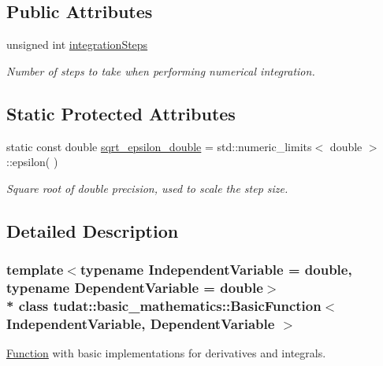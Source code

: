 \subsection*{Public Attributes}
\begin{DoxyCompactItemize}
\item 
unsigned int \hyperlink{classtudat_1_1basic__mathematics_1_1BasicFunction_ae29d47c0ba66688c59c793805c920386}{integration\+Steps}\hypertarget{classtudat_1_1basic__mathematics_1_1BasicFunction_ae29d47c0ba66688c59c793805c920386}{}\label{classtudat_1_1basic__mathematics_1_1BasicFunction_ae29d47c0ba66688c59c793805c920386}

\begin{DoxyCompactList}\small\item\em Number of steps to take when performing numerical integration. \end{DoxyCompactList}\end{DoxyCompactItemize}
\subsection*{Static Protected Attributes}
\begin{DoxyCompactItemize}
\item 
static const double \hyperlink{classtudat_1_1basic__mathematics_1_1BasicFunction_a9d9d85a5dd2bb72ec73619c126593f0d}{sqrt\+\_\+epsilon\+\_\+double} = std\+::numeric\+\_\+limits$<$ double $>$\+::epsilon( )
\begin{DoxyCompactList}\small\item\em Square root of double precision, used to scale the step size. \end{DoxyCompactList}\end{DoxyCompactItemize}


\subsection{Detailed Description}
\subsubsection*{template$<$typename Independent\+Variable = double, typename Dependent\+Variable = double$>$\\*
class tudat\+::basic\+\_\+mathematics\+::\+Basic\+Function$<$ Independent\+Variable, Dependent\+Variable $>$}

\hyperlink{classtudat_1_1basic__mathematics_1_1Function}{Function} with basic implementations for derivatives and integrals. 

